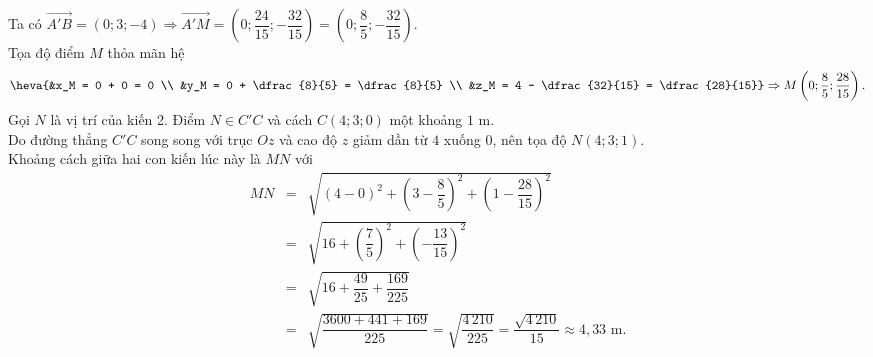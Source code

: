 \begin{ex}
{		Ta có $\overrightarrow{A'B} = (0; 3; -4) \Rightarrow \overrightarrow{A'M} = \left(0; \dfrac{24}{15}; -\dfrac{32}{15}\right) = \left(0; \dfrac{8}{5}; -\dfrac{32}{15}\right)$.\\
		Tọa độ điểm $M$ thỏa mãn hệ
		$$ \heva{&x_M = 0 + 0 = 0 \\ &y_M = 0 + \dfrac{8}{5} = \dfrac{8}{5} \\ &z_M = 4 - \dfrac{32}{15} = \dfrac{28}{15}} \Rightarrow M\left(0; \dfrac{8}{5}; \dfrac{28}{15}\right). $$
		Gọi $N$ là vị trí của kiến 2. Điểm $N \in C'C$ và cách $C(4;3;0)$ một khoảng $1$ m.\\
		Do đường thẳng $C'C$ song song với trục $Oz$ và cao độ $z$ giảm dần từ $4$ xuống $0$, nên tọa độ $N(4; 3; 1)$.\\
		Khoảng cách giữa hai con kiến lúc này là $MN$ với
		\allowdisplaybreaks
		\begin{eqnarray*}
			MN &=& \sqrt{(4-0)^2 + \left(3 - \dfrac{8}{5}\right)^2 + \left(1 - \dfrac{28}{15}\right)^2} \\
			&=& \sqrt{16 + \left(\dfrac{7}{5}\right)^2 + \left(-\dfrac{13}{15}\right)^2} \\
			&=& \sqrt{16 + \dfrac{49}{25} + \dfrac{169}{225}} \\
			&=& \sqrt{\dfrac{3600 + 441 + 169}{225}} = \sqrt{\dfrac{4\,210}{225}} = \dfrac{\sqrt{4\,210}}{15} \approx 4{,}33\text{ m}.
		\end{eqnarray*}
	}
\end{ex}
